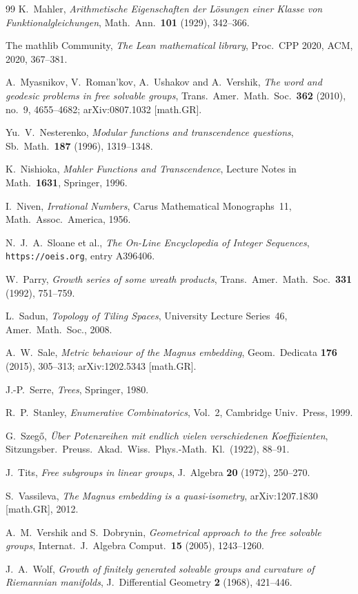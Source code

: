 \documentclass[11pt]{article}
\theoremstyle{plain}
\theoremstyle{definition}
\theoremstyle{remark}
\begin{document}
\begin{thebibliography}{99}
 K.~Mahler, \emph{Arithmetische Eigenschaften der L\"osungen einer Klasse
von Funktionalgleichungen}, Math.\ Ann.\ \textbf{101} (1929), 342--366.

 The mathlib Community, \emph{The Lean mathematical library},
Proc.\ CPP 2020, ACM, 2020, 367--381.

 A.~Myasnikov, V.~Roman'kov, A.~Ushakov and A.~Vershik, \emph{The
word and geodesic problems in free solvable groups}, Trans.\ Amer.\ Math.\ Soc.\
\textbf{362} (2010), no.~9, 4655--4682; arXiv:0807.1032 [math.GR].

 Yu.~V.~Nesterenko, \emph{Modular functions and transcendence
questions}, Sb.\ Math.\ \textbf{187} (1996), 1319--1348.

 K.~Nishioka, \emph{Mahler Functions and Transcendence},
Lecture Notes in Math.\ \textbf{1631}, Springer, 1996.

 I.~Niven, \emph{Irrational Numbers}, Carus Mathematical Monographs~11,
Math.\ Assoc.\ America, 1956.

 N.~J.~A.~Sloane et al., \emph{The On-Line Encyclopedia of Integer Sequences},
\texttt{https://oeis.org}, entry A396406.

 W.~Parry, \emph{Growth series of some wreath products}, Trans.\ Amer.\
Math.\ Soc.\ \textbf{331} (1992), 751--759.

 L.~Sadun, \emph{Topology of Tiling Spaces}, University Lecture
Series~46, Amer.\ Math.\ Soc., 2008.

 A.~W.~Sale, \emph{Metric behaviour of the Magnus embedding},
Geom.\ Dedicata \textbf{176} (2015), 305--313; arXiv:1202.5343 [math.GR].

\bibitem{Serre} J.-P.~Serre, \emph{Trees}, Springer, 1980.

 R.~P.~Stanley, \emph{Enumerative Combinatorics}, Vol.~2,
Cambridge Univ.\ Press, 1999.

 G.~Szeg\H{o}, \emph{\"Uber Potenzreihen mit endlich vielen verschiedenen
Koeffizienten}, Sitzungsber.\ Preuss.\ Akad.\ Wiss.\ Phys.-Math.\ Kl.\ (1922), 88--91.

\bibitem{Tits1972} J.~Tits, \emph{Free subgroups in linear groups},
J.\ Algebra \textbf{20} (1972), 250--270.

 S.~Vassileva, \emph{The Magnus embedding is a
quasi-isometry}, arXiv:1207.1830 [math.GR], 2012.

 A.~M.~Vershik and S.~Dobrynin, \emph{Geometrical approach to the
free solvable groups}, Internat.\ J.\ Algebra Comput.\ \textbf{15} (2005),
1243--1260.

 J.~A.~Wolf, \emph{Growth of finitely generated solvable
groups and curvature of Riemannian manifolds}, J.\ Differential Geometry
\textbf{2} (1968), 421--446.

\end{thebibliography}
\end{document}
